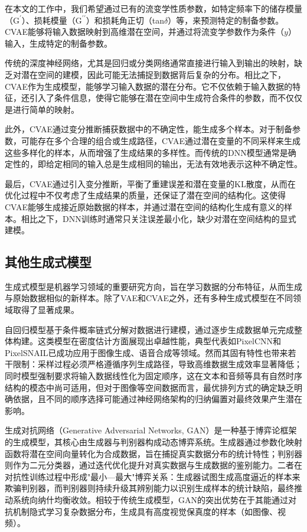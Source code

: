 在本文的工作中，我们希望通过已有的流变学性质参数，如特定频率下的储存模量（$\mathrm{G^{\prime}}$）、损耗模量（$\mathrm{G^{\prime\prime}}$）和损耗角正切（tan$\delta$）等，来预测特定的制备参数。CVAE能够将输入数据映射到高维潜在空间，并通过将流变学参数作为条件（$y$）输入，生成特定的制备参数。

传统的深度神经网络，尤其是回归或分类网络通常直接进行输入到输出的映射，缺乏对潜在空间的建模，因此可能无法捕捉到数据背后复杂的分布。相比之下，CVAE作为生成模型，能够学习输入数据的潜在分布。它不仅依赖于输入数据的特征，还引入了条件信息，使得它能够在潜在空间中生成符合条件的参数，而不仅仅是进行简单的映射。

此外，CVAE通过变分推断捕获数据中的不确定性，能生成多个样本。对于制备参数，可能存在多个合理的组合或生成路径，CVAE通过潜在变量的不同采样来生成这些多样化的样本，从而增强了生成结果的多样性。而传统的DNN模型通常是确定性的，即给定相同的输入总是生成相同的输出，无法有效地表示这种不确定性。

最后，CVAE通过引入变分推断，平衡了重建误差和潜在变量的KL散度，从而在优化过程中不仅考虑了生成结果的质量，还保证了潜在空间的结构化。这使得CVAE能够生成接近原始数据的样本，并通过潜在空间的结构化生成有意义的样本。相比之下，DNN训练时通常只关注误差最小化，缺少对潜在空间结构的显式建模。
\subsection{其他生成式模型}
生成式模型是机器学习领域的重要研究方向，旨在学习数据的分布特征，从而生成与原始数据相似的新样本。除了VAE和CVAE之外，还有多种生成式模型在不同领域取得了显著成果。

自回归模型基于条件概率链式分解对数据进行建模，通过逐步生成数据单元完成整体构建\cite{bengio2003adaptive}。这类模型在密度估计方面展现出卓越性能，典型代表如PixelCNN和PixelSNAIL已成功应用于图像生成、语音合成等领域。然而其固有特性也带来若干限制：采样过程必须严格遵循序列生成路径，导致高维数据生成效率显著降低；同时模型强制要求将输入数据线性化为固定顺序，这在文本和音频等具有自然时序结构的模态中尚可适用，但对于图像等空间数据而言，最优排列方式的确定缺乏明确依据，且不同的顺序选择可能通过神经网络架构的归纳偏置对最终效果产生潜在影响\cite{bondtaylor2022deep}。

生成对抗网络（Generative Adversarial Networks​​, GAN）是一种基于博弈论框架的生成模型，其核心由生成器与判别器构成动态博弈系统\cite{NIPS2014_5ca3e9b1}。生成器通过参数化映射函数将潜在空间向量转化为合成数据，旨在捕捉真实数据分布的统计特性；判别器则作为二元分类器，通过迭代优化提升对真实数据与生成数据的鉴别能力。二者在对抗性训练过程中形成"最小---最大"博弈关系：生成器试图生成高度逼近的样本来欺骗判别器，而判别器则持续升级其辨别能力以识别生成样本的统计缺陷，最终推动系统向纳什均衡收敛。相较于传统生成模型，GAN的突出优势在于其能通过对抗机制隐式学习复杂数据分布，生成具有高度视觉保真度的样本（如图像、视频）\cite{Goodfellow2020Generative}。

